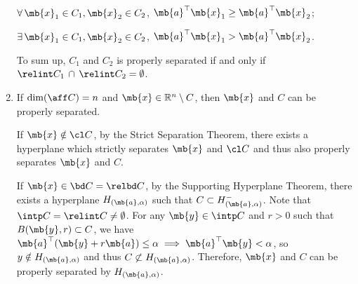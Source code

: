 \begin{exercise}
\begin{enumerate}
\begin{solution}
\begin{center}
          $\forall\, \mb{x}_1\in C_1, \mb{x}_2\in C_2$, $\mb{a}^\top \mb{x}_1 \ge \mb{a}^\top \mb{x}_2$;\par
          $\exists\, \mb{x}_1\in C_1, \mb{x}_2\in C_2$, $ \mb{a}^\top \mb{x}_1 > \mb{a}^\top \mb{x}_2$.
        \end{center}
        To sum up, $C_1$ and $C_2$ is properly separated if and only if $\relint C_1\,\cap\,\relint C_2=\emptyset$.
        \qedhere
      \end{solution}
    \item
      If $\dim (\aff C)=n$ and $\mb{x}\in\mathbb{R}^n\setminus C$, then $\mb{x}$ and $C$ can be properly separated.
      \begin{solution}
        If $\mb{x}\notin \cl C$, by the Strict Separation Theorem, there exists a hyperplane which strictly separates $\mb{x}$ and $\cl C$ and thus also properly separates $\mb{x}$ and $C$. 

        If $\mb{x}\in \bd C=\relbd C $, by the Supporting Hyperplane Theorem, there exists a hyperplane $H_{(\mb{a},\alpha)}$ such that $C\subset H^-_{(\mb{a},\alpha)}$. Note that $\intp C  = \relint C \neq \emptyset$. For any $\mb{y}\in \intp C$ and $r>0$ such that $B(\mb{y},r)\subset C$, we have $\mb{a}^\top(\mb{y}+r\mb{a}) \le \alpha \implies \mb{a}^\top\mb{y} < \alpha$, so $y\notin H_{(\mb{a},\alpha)}$ and thus $C \not\subset H_{(\mb{a},\alpha)}$. Therefore, $\mb{x}$ and $C$ can be properly separated by $H_{(\mb{a},\alpha)}$.
        \qedhere
      \end{solution}
  \end{enumerate}
\end{exercise}
\newpage


